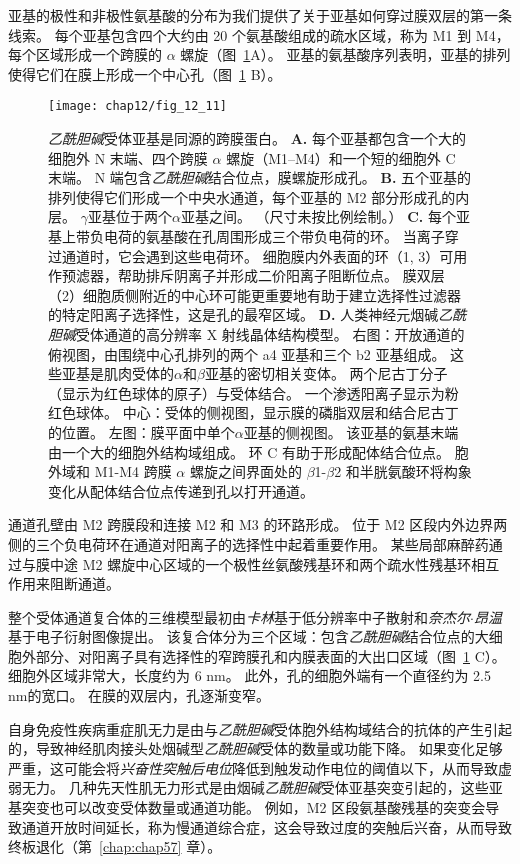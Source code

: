 亚基的极性和非极性氨基酸的分布为我们提供了关于亚基如何穿过膜双层的第一条线索。
每个亚基包含四个大约由 20 个氨基酸组成的疏水区域，称为 M1 到 M4，每个区域形成一个跨膜的 $\alpha$ 螺旋（图~\ref{fig:12_11}A）。
亚基的氨基酸序列表明，亚基的排列使得它们在膜上形成一个中心孔（图~\ref{fig:12_11} B）。


\begin{figure}[htbp]
	\centering
	\texttt{[image: chap12/fig\_12\_11]}
	\caption{\textit{乙酰胆碱}受体亚基是同源的跨膜蛋白。
		\textbf{A.} 每个亚基都包含一个大的细胞外 N 末端、四个跨膜 $\alpha$ 螺旋（M1–M4）和一个短的细胞外 C 末端。
		N 端包含\textit{乙酰胆碱}结合位点，膜螺旋形成孔。
		\textbf{B.} 五个亚基的排列使得它们形成一个中央水通道，每个亚基的 M2 部分形成孔的内层。
		$\gamma$亚基位于两个$\alpha$亚基之间。 （尺寸未按比例绘制。）
		\textbf{C.} 每个亚基上带负电荷的氨基酸在孔周围形成三个带负电荷的环。
		当离子穿过通道时，它会遇到这些电荷环。
		细胞膜内外表面的环（1, 3）可用作预滤器，帮助排斥阴离子并形成二价阳离子阻断位点。
		膜双层（2）细胞质侧附近的中心环可能更重要地有助于建立选择性过滤器的特定阳离子选择性，这是孔的最窄区域。
		\textbf{D.} 人类神经元烟碱\textit{乙酰胆碱}受体通道的高分辨率 X 射线晶体结构模型。
		右图：开放通道的俯视图，由围绕中心孔排列的两个 a4 亚基和三个 b2 亚基组成。
		这些亚基是肌肉受体的$\alpha$和$\beta$亚基的密切相关变体。
		两个尼古丁分子（显示为红色球体的原子）与受体结合。
		一个渗透阳离子显示为粉红色球体。
		中心：受体的侧视图，显示膜的磷脂双层和结合尼古丁的位置。
		左图：膜平面中单个$\alpha$亚基的侧视图。
		该亚基的氨基末端由一个大的细胞外结构域组成。
		环 C 有助于形成配体结合位点。
		胞外域和 M1-M4 跨膜 $\alpha$ 螺旋之间界面处的 $\beta$1-$\beta$2 和半胱氨酸环将构象变化从配体结合位点传递到孔以打开通道\cite{morales2016x}。}
	\label{fig:12_11}
\end{figure}


通道孔壁由 M2 跨膜段和连接 M2 和 M3 的环路形成。
位于 M2 区段内外边界两侧的三个负电荷环在通道对阳离子的选择性中起着重要作用。
某些局部麻醉药通过与膜中途 M2 螺旋中心区域的一个极性丝氨酸残基环和两个疏水性残基环相互作用来阻断通道。


整个受体通道复合体的三维模型最初由\textit{卡林}基于低分辨率中子散射和\textit{奈杰尔$\cdot$昂温}基于电子衍射图像提出。
该复合体分为三个区域：包含\textit{乙酰胆碱}结合位点的大细胞外部分、对阳离子具有选择性的窄跨膜孔和内膜表面的大出口区域（图~\ref{fig:12_11} C）。
细胞外区域非常大，长度约为 6 nm。
此外，孔的细胞外端有一个直径约为 2.5 nm的宽口。
在膜的双层内，孔逐渐变窄。


自身免疫性疾病重症肌无力是由与\textit{乙酰胆碱}受体胞外结构域结合的抗体的产生引起的，导致神经肌肉接头处烟碱型\textit{乙酰胆碱}受体的数量或功能下降。
如果变化足够严重，这可能会将\textit{兴奋性突触后电位}降低到触发动作电位的阈值以下，从而导致虚弱无力。
几种先天性肌无力形式是由烟碱\textit{乙酰胆碱}受体亚基突变引起的，这些亚基突变也可以改变受体数量或通道功能。
例如，M2 区段氨基酸残基的突变会导致通道开放时间延长，称为慢通道综合症，这会导致过度的突触后兴奋，从而导致终板退化（第~\ref{chap:chap57} 章）。




